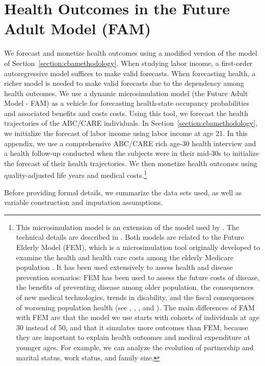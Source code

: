 \section{Health Outcomes in the Future Adult Model (FAM)} \label{appendix:health}

We forecast and monetize health outcomes using a modified version of the model of Section~\ref{section:cbamethodology}. When studying labor income, a first-order autoregressive model suffices to make valid forecasts. When forecasting health, a richer model is needed to make valid forecasts due to the dependency among health outcomes. We use a dynamic microsimulation model (the Future Adult Model - FAM) as a vehicle for forecasting health-state occupancy probabilities and associated benefits and costs costs. Using this tool, we forecast the health trajectories of the ABC/CARE individuals. In Section~\ref{section:cbamethodology}, we initialize the forecast of labor income using labor income at age 21. In this appendix, we use a comprehensive ABC/CARE rich age-30 health interview and a health follow-up conducted when the subjects were in their mid-30s to initialize the forecast of their health trajectories. We then monetize health outcomes using quality-adjusted life years and medical costs.\footnote{This microsimulation model is an extension of the model used by \citet{Prados_etal_2015_How-Much-Can-Education}. The technical details are described in \citet{Goldman_etal_2015_Future-Adult-Model}. Both models are related to the Future Elderly Model (FEM), which is a microsimulation tool originally developed to examine the health and health care costs among the elderly Medicare population \citep{Goldman_etal_2004_RAND-Report_Health-Status-Elderly}. It has been used extensively to assess health and disease prevention scenarios: FEM has been used to assess the future costs of disease, the benefits of preventing disease among older population, the consequences of new medical technologies, trends in disability, and the fiscal consequences of worsening population health (see \citet{Goldman_etal_2004_RAND-Report_Health-Status-Elderly}, \citet{Lakdawalla_etal_2004_Health-and-Cost}, \citet{Goldman_etal_2005_HA}, and \citet{Zissimopoulos_etal_2014_Delaying-Alzheimers}). The main differences of FAM with FEM are that the model we use starts with cohorts of individuals at age 30 instead of 50, and that it simulates more outcomes than FEM, because they are important to explain health outcomes and medical expenditure at younger ages. For example, we can analyze the evolution of partnership and marital status, work status, and family size.}

\noindent Before providing formal details, we summarize the data sets used, as well as variable construction and imputation assumptions.




%

